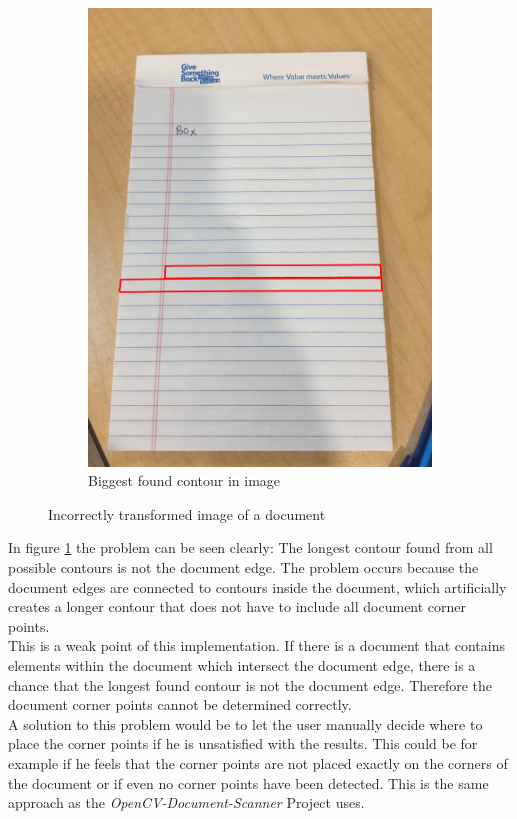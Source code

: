\begin{figure}[H]
\begin{subfigure}[t]{0.3\textwidth}
         \includegraphics[width=\textwidth]{images/4_image/biggest_contour.png}
         \caption{Biggest found contour in image}
         \label{fig:note_biggest}
     \end{subfigure}
        \caption{Incorrectly transformed image of a document}
        \label{fig:note_error}
\end{figure}

\newpage

In figure \ref{fig:note_biggest} the problem can be seen clearly: The longest contour found from all possible contours is not the document edge. The problem occurs because the document edges are connected to contours inside the document, which artificially creates a longer contour that does not have to include all document corner points.\\

This is a weak point of this implementation. If there is a document that contains elements within the document which intersect the document edge, there is a chance that the longest found contour is not the document edge. Therefore the document corner points cannot be determined correctly.\\

A solution to this problem would be to let the user manually decide where to place the corner points if he is unsatisfied with the results. This could be for example if he feels that the corner points are not placed exactly on the corners of the document or if even no corner points have been detected. This is the same approach as the \textit{OpenCV-Document-Scanner} Project uses.
